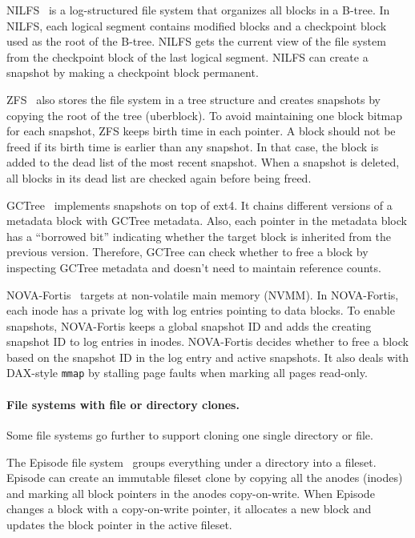 NILFS~\citep{nilfs2} is a log-structured file system that organizes all blocks
in a B-tree.
In NILFS, each logical segment contains modified blocks and a checkpoint block
used as the root of the B-tree.
NILFS gets the current view of the file system from the checkpoint block
of the last logical segment.
NILFS can create a snapshot by making a checkpoint block permanent.

ZFS~\citep{zfs} also stores the file system in a tree structure and creates
snapshots by copying the root of the tree (uberblock).
To avoid maintaining one block bitmap for each snapshot, ZFS keeps birth time
in each pointer.
A block should not be freed if its birth time is earlier than any snapshot.
In that case, the block is added to the dead list of the most recent snapshot.
When a snapshot is deleted, all blocks in its dead list are checked again before
being freed.

GCTree~\citep{gctree} implements snapshots on top of ext4.
It chains different versions of a metadata block with GCTree metadata.
Also, each pointer in the metadata block has a ``borrowed bit'' indicating
whether the target block is inherited from the previous version.
Therefore, GCTree can check whether to free a block by inspecting GCTree
metadata and doesn't need to maintain reference counts.

NOVA-Fortis~\citep{nova} targets at non-volatile main memory (NVMM).
In NOVA-Fortis, each inode has a private log with log entries pointing
to data blocks.
To enable snapshots, NOVA-Fortis keeps a global snapshot ID and adds the
creating snapshot ID to log entries in inodes.
NOVA-Fortis decides whether to free a block based on the snapshot ID in the log
entry and active snapshots.
It also deals with DAX-style \texttt{mmap} by stalling page faults when marking
all pages read-only.

\paragraph{File systems with file or directory clones.}

Some file systems go further to support cloning one single directory or file.

The Episode file system~\citep{episode} groups everything under a directory into
a fileset.
Episode can create an immutable fileset clone by copying all the anodes (inodes)
and marking all block pointers in the anodes copy-on-write.
When Episode changes a block with a copy-on-write pointer, it allocates a new
block and updates the block pointer in the active fileset.

